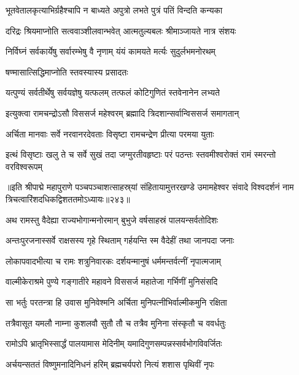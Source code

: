 \twolineshloka
{भूतवेतालकृत्याभिर्ग्रहैश्चापि न बाध्यते}
{अपुत्रो लभते पुत्रं पतिं विन्दति कन्यका}%

\twolineshloka
{दरिद्रः श्रियमाप्नोति सत्ववाञ्शीलवान्भवेत्}
{आत्मतुल्यबलः श्रीमाञ्जायते नात्र संशयः}%

\twolineshloka
{निर्विघ्नं सर्वकार्येषु सर्वारम्भेषु वै नृणाम्}
{यंयं कामयते मर्त्यः सुदुर्लभमनोरथम्}%

षण्मासात्सिद्धिमाप्नोति स्तवस्यास्य प्रसादतः

\twolineshloka
{यत्पुण्यं सर्वतीर्थेषु सर्वयज्ञेषु यत्फलम्}
{तत्फलं कोटिगुणितं स्तवेनानेन लभ्यते}%


\twolineshloka
{इत्युक्त्वा रामचन्द्रोऽसौ विससर्ज महेश्वरम्}
{ब्रह्मादि त्रिदशान्सर्वान्विससर्ज समागतान्}%

\twolineshloka
{अर्चिता मानवाः सर्वे नरवानरदेवताः}
{विसृष्टा रामचन्द्रेण प्रीत्या परमया युताः}%

\twolineshloka
{इत्थं विसृष्टाः खलु ते च सर्वे सुखं तदा जग्मुरतीवहृष्टाः}
{परं पठन्तः स्तवमीश्वरोक्तं रामं स्मरन्तो वरविश्वरूपम्}%

॥इति श्रीपाद्मे महापुराणे पञ्चपञ्चाशत्साहस्र्यां संहितायामुत्तरखण्डे उमामहेश्वर संवादे विश्वदर्शनं नाम त्रिचत्वारिंशदधिकद्विशततमोऽध्यायः॥२४३॥



\twolineshloka
{अथ रामस्तु वैदेह्या राज्यभोगान्मनोरमान्}
{बुभुजे वर्षसाहस्रं पालयन्सर्वतोदिशः}%

\twolineshloka
{अन्तःपुरजनास्सर्वे राक्षसस्य गृहे स्थिताम्}
{गर्हयन्ति स्म वैदेहीं तथा जानपदा जनाः}%

\twolineshloka
{लोकापवादभीत्या च रामः शत्रुनिवारकः}
{दर्शयन्मानुषं धर्ममन्तर्वत्नीं नृपात्मजाम्}%

\twolineshloka
{वाल्मीकेराश्रमे पुण्ये गङ्गातीरे महावने}
{विससर्ज महातेजा गर्भिणीं मुनिसंसदि}%

\twolineshloka
{सा भर्तुः परतन्त्रा हि उवास मुनिवेश्मनि}
{अर्चिता मुनिपत्नीभिर्वाल्मीकमुनि रक्षिता}%

\twolineshloka
{तत्रैवासूत यमलौ नाम्ना कुशलवौ सुतौ}
{तौ च तत्रैव मुनिना संस्कृतौ च ववर्धतुः}%

\twolineshloka
{रामोऽपि भ्रातृभिस्सार्द्धं पालयामास मेदिनीम्}
{यमादिगुणसम्पन्नस्सर्वभोगविवर्जितः}%

\twolineshloka
{अर्चयन्सततं विष्णुमनादिनिधनं हरिम्}
{ब्रह्मचर्यपरो नित्यं शशास पृथिवीं नृपः}%

